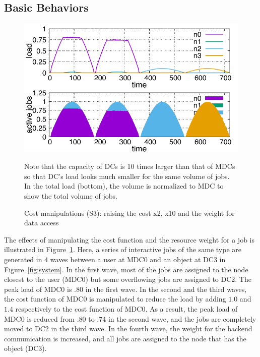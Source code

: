 \subsection{Basic Behaviors}

\begin{figure}[tb]
  \begin{center}
    \includegraphics[width=1.0\columnwidth]{lowering.pdf}
    \vspace{-2.0ex}
    \caption{Cost manipulations (S3): raising the cost x2,
      x10 and the weight for data access}
    \smallskip
    \raggedright
    \small
    Note that the capacity of DCs is 10 times larger than that of MDCs
    so that DC's load looks much smaller for the same volume of jobs.
    In the total load (bottom), the volume is normalized to MDC to
    show the total volume of jobs.
    \label{fig:lowering}
  \end{center}
\end{figure}

The effects of manipulating the cost function and the resource weight
for a job is illustrated in Figure~\ref{fig:lowering}.
Here, a series of interactive jobs of the same type are generated in
4 waves between a user at MDC0 and an object at DC3 in
Figure~\ref{fig:system}.
In the first wave,  most of the jobs are assigned to the node closest
to the user (MDC0) but some overflowing jobs are assigned to DC2.
The peak load of MDC0 is .80 in the first wave.
In the second and the third waves, the cost function of MDC0 is
manipulated to reduce the load by adding $1.0$ and $1.4$ respectively to
the cost function of MDC0. As a result, the peak load of MDC0 is
reduced from $.80$ to $.74$ in the second wave, and the jobs are
completely moved to DC2 in the third wave.
In the fourth wave, the weight for the backend communication is
increased, and all jobs are assigned to the node that has the object
(DC3).

